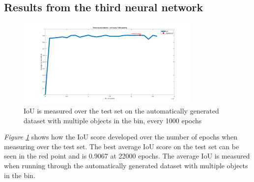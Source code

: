 \subsection{Results from the third neural network}
\begin{figure}[h]
 \centering
 \includegraphics[width=0.8\textwidth, trim={5cm 0 4cm 0},clip]{graphics/results/thirdneuralnetwork.png}
 \caption{IoU is measured over the test set on the automatically generated dataset with multiple objects in the bin, every 1000 epochs}
 \label{fig:v3neuralnetwork}
\end{figure}
\textit{Figure \ref{fig:v3neuralnetwork}} shows how the IoU score developed over the number of epochs when measuring over the test set. The best average IoU score on the test set can be seen in the red point and is 0.9067 at 22000 epochs. The average IoU is measured when running through the automatically generated dataset with multiple objects in the bin.


